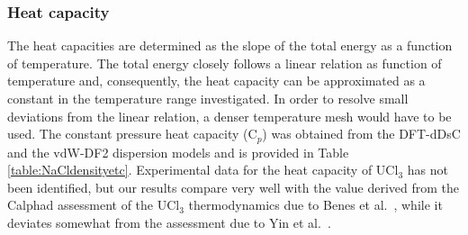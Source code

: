 \documentclass[preprint,3p,10pt,onecolumn,number,sort&compress]{elsarticle}
\begin{document}
{\subsubsection{Heat capacity} 


The heat capacities are determined as the slope of the total energy as a function of temperature. The total energy closely follows a linear relation as function of temperature and, consequently, the heat capacity can be approximated as a constant in the temperature range investigated. In order to resolve small deviations from the linear relation, a denser temperature mesh would have to be used. The constant pressure heat capacity (C$_p$) was obtained from the DFT-dDsC and the vdW-DF2 dispersion models and is provided in Table \ref{table:NaCldensityetc}. Experimental data for the heat capacity of UCl$_3$ has not been identified, but our results compare very well with the value derived from the Calphad assessment of the UCl$_3$ thermodynamics due to Benes et al.~\cite{BENES2008}, while it deviates somewhat from the assessment due to Yin et al.~\cite{YIN2020}.

}
\end{document}
